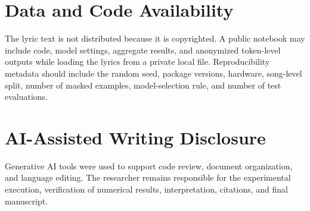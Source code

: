 \documentclass[10pt,letterpaper]{article}
\begin{document}
\section*{Data and Code Availability}
The lyric text is not distributed because it is copyrighted. A public notebook may include code, model settings, aggregate results, and anonymized token-level outputs while loading the lyrics from a private local file. Reproducibility metadata should include the random seed, package versions, hardware, song-level split, number of masked examples, model-selection rule, and number of test evaluations.

\section*{AI-Assisted Writing Disclosure}
Generative AI tools were used to support code review, document organization, and language editing. The researcher remains responsible for the experimental execution, verification of numerical results, interpretation, citations, and final manuscript.

\clearpage
\printbibliography[title={REFERENCES}]
\end{document}
